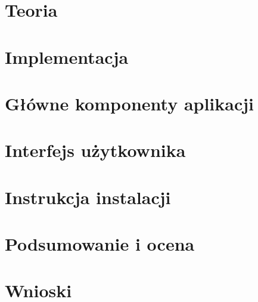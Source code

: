 \documentclass[a4paper,11pt,twoside]{report}
\newcommand\blankpage{%
	\null
	\thispagestyle{empty}%
	\addtocounter{page}{-1}%
	\newpage}
\theoremstyle{definition}
\begin{document}
\chapter{Teoria} \label{chap:teoria}


\afterpage{\blankpage}

\chapter{Implementacja} \label{chap:impl}


\afterpage{\blankpage}

\chapter{Główne komponenty aplikacji} \label{chap:glowne_komp}


\afterpage{\blankpage}

\chapter{Interfejs użytkownika} \label{chap:ui}


\chapter{Instrukcja instalacji} \label{chap:insr_instalacji}


\afterpage{\blankpage}

\chapter{Podsumowanie i ocena} \label{chap:podsumowanie}


\afterpage{\blankpage}

\chapter{Wnioski} \label{chap:wnioski}


\end{document}
